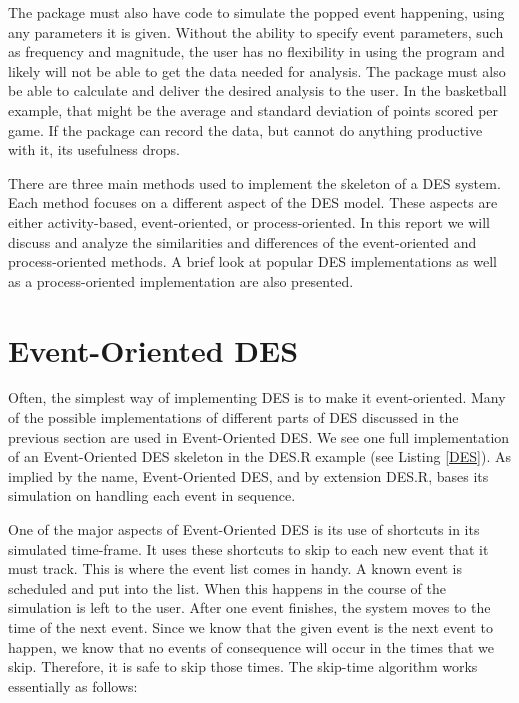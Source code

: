 \documentclass[a4paper, 11pt]{article} %
\begin{document}
The package must also have code to simulate the popped event happening, using any parameters it is given. Without the ability to specify event parameters, such as frequency and magnitude, the user has no flexibility in using the program and likely will not be able to get the data needed for analysis. The package must also be able to calculate and deliver the desired analysis to the user. In the basketball example, that might be the average and standard deviation of points scored per game. If the package can record the data, but cannot do anything productive with it, its usefulness drops.

There are three main methods used to implement the skeleton of a DES system. Each method focuses on a different aspect of the DES model. These aspects are either activity-based, event-oriented, or process-oriented. In this report we will discuss and analyze the similarities and differences of the event-oriented and process-oriented methods. A brief look at popular DES implementations as well as a process-oriented implementation are also presented.


\section{Event-Oriented DES}


Often, the simplest way of implementing DES is to make it event-oriented. Many of the possible implementations of different parts of DES discussed in the previous section are used in Event-Oriented DES. We see one full implementation of an Event-Oriented DES skeleton in the DES.R example (see Listing \ref{DES}). As implied by the name, Event-Oriented DES, and by extension DES.R, bases its simulation on handling each event in sequence.

One of the major aspects of Event-Oriented DES is its use of shortcuts in its simulated time-frame. It uses these shortcuts to skip to each new event that it must track. This is where the event list comes in handy. A known event is scheduled and put into the list. When this happens in the course of the simulation is left to the user. After one event finishes, the system moves to the time of the next event. Since we know that the given event is the next event to happen, we know that no events of consequence will occur in the times that we skip. Therefore, it is safe to skip those times. The skip-time algorithm works essentially as follows: \newline
\end{document}
